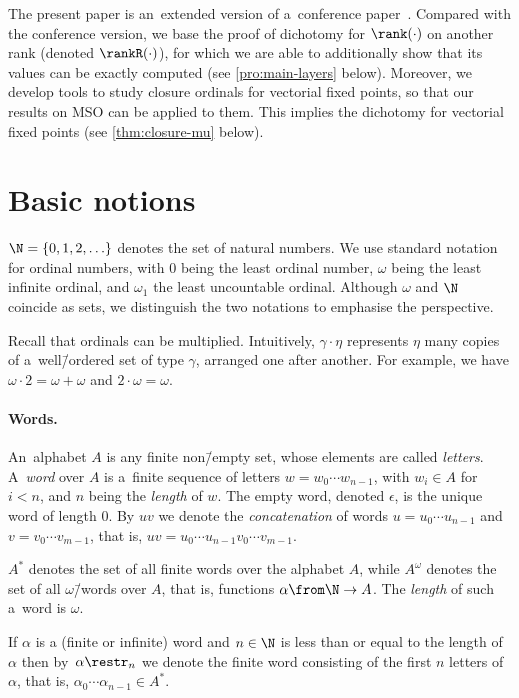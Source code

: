 \documentclass{lmcs}
\numberwithin{equation}{section}
\numberwithin{figure}{section}
\begin{document}
The present paper is an~extended version of a~conference paper~\cite{dichotomy-stacs}. Compared with the conference version, we base the proof of dichotomy for $\rank(\cdot)$ on another rank (denoted $\rankR(\cdot)$), for which we are able to additionally show that its values can be exactly computed (see \cref{pro:main-layers} below). Moreover, we develop tools to study closure ordinals for vectorial fixed points, so that our results on MSO can be applied to them. This implies the dichotomy for vectorial fixed points (see \cref{thm:closure-mu} below).



\section{Basic notions}\label{sec:basic}

$\N=\{0,1,2,\ldots\}$ denotes the set of natural numbers.
We use standard notation for ordinal numbers, with $0$ being the least ordinal number, $\omega$ being the least infinite ordinal, and $\omega_1$ the least uncountable ordinal.
Although $\omega$ and $\N$ coincide as sets, we distinguish the two notations to emphasise the perspective.

Recall that ordinals can be multiplied.
Intuitively, $\gamma\cdot\eta$ represents $\eta$ many copies of a~well\=/ordered set of type $\gamma$, arranged one after another.
For example, we have $\omega\cdot 2=\omega+\omega$ and $2\cdot\omega=\omega$.


\paragraph*{Words.}
An~alphabet $A$ is any finite non\=/empty set, whose elements are called \emph{letters}.
A~\emph{word} over $A$ is a~finite sequence of letters $w=w_0\cdots w_{n-1}$, with $w_i\in A$ for $i <n$, and $n$ being the \emph{length} of $w$.
The empty word, denoted $\epsilon$, is the unique word of length $0$.
By $u v$ we denote the \emph{concatenation} of words $u=u_0\cdots u_{n-1}$ and $v=v_0\cdots v_{m-1}$, that is, $u v = u_0\cdots u_{n-1} v_0\cdots v_{m-1}$.

$A^\ast$ denotes the set of all finite words over the alphabet $A$, while $A^\omega$ denotes the set of all $\omega$\=/words over $A$, that is, functions $\alpha\from \N\to A$.
The \emph{length} of such a~word is $\omega$.

If $\alpha$ is a (finite or infinite) word and $n\in\N$ is less than or equal to the length of $\alpha$ then by~$\alpha\restr_n$
we denote the finite word consisting of the first $n$ letters of $\alpha$, that is, $\alpha_0\cdots\alpha_{n-1}\in A^\ast$.
\end{document}
